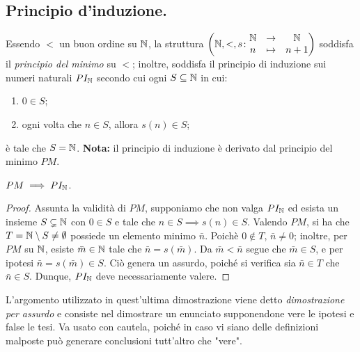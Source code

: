 \subsection{Principio d'induzione.}
Essendo \(<\) un buon ordine su \(\mathbb{N}\), la struttura \(\left(\mathbb{N}, <, s \colon \begin{matrix}\mathbb{N} & \to & \mathbb{N} \\ n & \mapsto & n+1\end{matrix}\right)\) soddisfa il \emph{principio del minimo} su \(<\); inoltre, soddisfa il principio di induzione sui numeri naturali \(PI_{\mathbb{N}}\) secondo cui ogni \(S \subseteq \mathbb{N}\) in cui:
\begin{enumerate}
  \item \(0 \in S\);
  \item ogni volta che \(n \in S\), allora \(s(n) \in S\);
\end{enumerate}
è tale che \(S = \mathbb{N}\). {\bf Nota:} il principio di induzione è derivato dal principio del minimo \(PM\).
\begin{prp}
  \(PM \implies PI_{\mathbb{N}}\).
\end{prp}
\begin{proof}
  Assunta la validità di \(PM\), supponiamo che non valga \(PI_{\mathbb{N}}\) ed esista un insieme \(S \subsetneq \mathbb{N}\) con \(0 \in S\) e tale che \(n \in S \implies s(n) \in S\). Valendo \(PM\), si ha che \(T = \mathbb{N} \setminus S \neq \emptyset\) possiede un elemento minimo \(\bar{n}\). Poichè \(0 \notin T\), \(\bar{n} \neq 0\); inoltre, per \(PM\) su \(\mathbb{N}\), esiste \(\bar{m} \in \mathbb{N}\) tale che \(\bar{n} = s(\bar{m})\).
  Da \(\bar{m} < \bar{n}\) segue che \(\bar{m} \in S\), e per ipotesi \(\bar{n} = s(\bar{m}) \in S\). Ciò genera un assurdo, poiché si verifica sia \(\bar{n} \in T\) che \(\bar{n} \in S\). Dunque, \(PI_{\mathbb{N}}\) deve necessariamente valere.
\end{proof}
L'argomento utilizzato in quest'ultima dimostrazione viene detto \emph{dimostrazione per assurdo} e consiste nel dimostrare un enunciato supponendone vere le ipotesi e false le tesi. Va usato con cautela, poiché in caso vi siano delle definizioni malposte può generare conclusioni tutt'altro che "vere".

